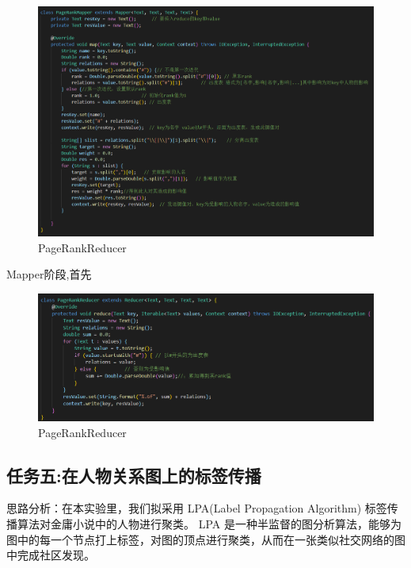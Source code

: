 \documentclass[a4paper,UTF8]{article}
\numberwithin{equation}{section}
\begin{document}
\begin{figure}[H]
    \centering

    \includegraphics[width = 15cm]{PageRankMapper.png}

    \caption{PageRankReducer}
\end{figure}
Mapper阶段,首先
\begin{figure}[H]
    \centering

    \includegraphics[width = 15cm]{PageRankReducer.png}

    \caption{PageRankReducer}
\end{figure}

\subsection{任务五:在人物关系图上的标签传播}
思路分析：在本实验里，我们拟采用 LPA(Label Propagation Algorithm) 标签传播算法对金庸小说中的人物进行聚类。 LPA 是一种半监督的图分析算法，能够为图中的每一个节点打上标签，对图的顶点进行聚类，从而在一张类似社交网络的图中完成社区发现。
\end{document}
